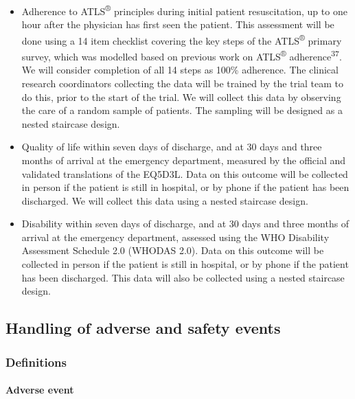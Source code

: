 \documentclass[
]{scrartcl}
\let\oldparagraph\paragraph
\renewcommand{\paragraph}[1]{\oldparagraph{#1}\mbox{}}
\providecommand{\tightlist}{%
  \setlength{\itemsep}{0pt}\setlength{\parskip}{0pt}}\usepackage{longtable,booktabs,array}
\begin{document}
\begin{itemize}
\tightlist
\item
  Adherence to ATLS\textsuperscript{®} principles during initial patient
  resuscitation, up to one hour after the physician has first seen the
  patient. This assessment will be done using a 14 item checklist
  covering the key steps of the ATLS\textsuperscript{®} primary survey,
  which was modelled based on previous work on ATLS\textsuperscript{®}
  adherence\textsuperscript{37}. We will consider completion of all 14
  steps as 100\% adherence. The clinical research coordinators
  collecting the data will be trained by the trial team to do this,
  prior to the start of the trial. We will collect this data by
  observing the care of a random sample of patients. The sampling will
  be designed as a nested staircase design.
\item
  Quality of life within seven days of discharge, and at 30 days and
  three months of arrival at the emergency department, measured by the
  official and validated translations of the EQ5D3L. Data on this
  outcome will be collected in person if the patient is still in
  hospital, or by phone if the patient has been discharged. We will
  collect this data using a nested staircase design.
\item
  Disability within seven days of discharge, and at 30 days and three
  months of arrival at the emergency department, assessed using the WHO
  Disability Assessment Schedule 2.0 (WHODAS 2.0). Data on this outcome
  will be collected in person if the patient is still in hospital, or by
  phone if the patient has been discharged. This data will also be
  collected using a nested staircase design.
\end{itemize}

\hypertarget{handling-of-adverse-and-safety-events}{%
\subsection{Handling of adverse and safety
events}\label{handling-of-adverse-and-safety-events}}

\hypertarget{definitions}{%
\subsubsection{Definitions}\label{definitions}}

\hypertarget{adverse-event}{%
\paragraph{Adverse event}\label{adverse-event}}
\end{document}
